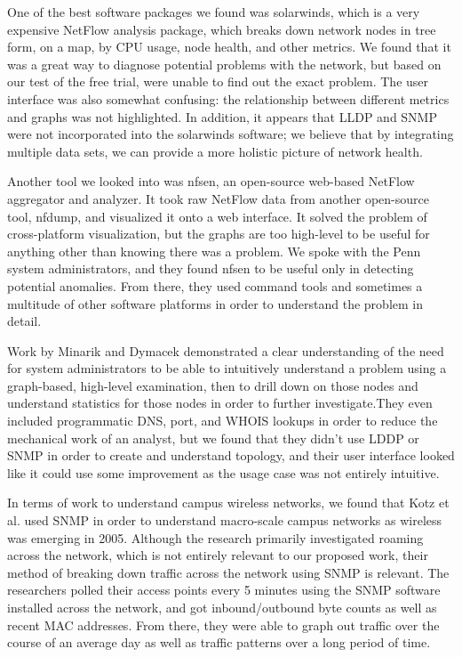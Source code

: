\documentclass{sig-alternate}
\begin{document}
One of the best software packages we found was solarwinds, which is a very
expensive NetFlow analysis package, which breaks down network nodes in tree
form, on a map, by CPU usage, node health, and other metrics. We found that it
was a great way to diagnose potential problems with the network, but based on
our test of the free trial, were unable to find out the exact problem. The user
interface was also somewhat confusing: the relationship between different
metrics and graphs was not highlighted. In addition, it appears that LLDP and
SNMP were not incorporated into the solarwinds software; we believe that by
integrating multiple data sets, we can provide a more holistic picture of
network health.

Another tool we looked into was nfsen, an open-source web-based NetFlow
aggregator and analyzer. It took raw NetFlow data from another open-source tool,
nfdump, and visualized it onto a web interface. It solved the problem of
cross-platform visualization, but the graphs are too high-level to be useful for
anything other than knowing there was a problem. We spoke with the Penn system
administrators, and they found nfsen to be useful only in detecting potential
anomalies. From there, they used command tools and sometimes a multitude of
other software platforms in order to understand the problem in detail.

Work by Minarik and Dymacek\cite{Minarik08} demonstrated a clear understanding
of the need for system administrators to be able to intuitively understand a
problem using a graph-based, high-level examination, then to drill down on those
nodes and understand statistics for those nodes in order to further
investigate.They even included programmatic DNS, port, and WHOIS lookups in
order to reduce the mechanical work of an analyst, but we found that they didn’t
use LDDP or SNMP in order to create and understand topology, and their user
interface looked like it could use some improvement as the usage case was not
entirely intuitive.

In terms of work to understand campus wireless networks, we found that Kotz et
al.\cite{Kotz05} used SNMP in order to understand macro-scale campus networks
as wireless was emerging in 2005. Although the research primarily investigated
roaming across the network, which is not entirely relevant to our proposed work,
their method of breaking down traffic across the network using SNMP is relevant.
The researchers polled their access points every 5 minutes using the SNMP
software installed across the network, and got inbound/outbound byte counts as
well as recent MAC addresses. From there, they were able to graph out traffic
over the course of an average day as well as traffic patterns over a long period
of time.
\end{document}
